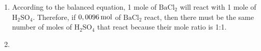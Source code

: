 {\begin{mdframed}[linewidth=4, leftmargin=40, rightmargin=40]
\begin{exercise}
\begin{enumerate}[noitemsep, label=\textbf{Step} \textbf{\arabic*}. ]
      \item  
      \label{m38717*id279344}According to the balanced equation, 1 mole of \begin{math}\mathrm{BaCl}{}_{2}\end{math} will react with 1 mole of \begin{math}\mathrm{H}{}_{2}\mathrm{SO}{}_{4}\end{math}. Therefore, if \begin{math}0,0096\phantom{\rule{2pt}{0ex}}\mathrm{mol}\end{math} of \begin{math}\mathrm{BaCl}{}_{2}\end{math} react, then there must be the same number of moles of \begin{math}\mathrm{H}{}_{2}\mathrm{SO}{}_{4}\end{math} that react because their mole ratio is 1:1.\par 
      \item  
      \label{m38717*id279456}\nopagebreak\noindent{}
    

\end{enumerate}
\end{exercise}
\end{mdframed}}
